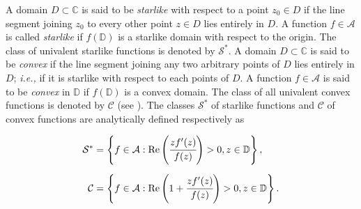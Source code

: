\documentclass[a4paper,12pt]{amsart}
\theoremstyle{definition}
\numberwithin{equation}{section}
\begin{document}
A domain $D \subset \mathbb{C}$ is said to be {\em starlike} with respect to a point $z_0\in D$ if the line segment joining $z_0$ to every other point $z \in D$ lies entirely in $D$. A function $f \in \mathcal{A}$ is called {\em starlike} if $f(\mathbb{D})$ is a starlike domain with respect to the origin. The class of univalent starlike functions is denoted by $\mathcal{S}^*$. A domain $D \subset \mathbb{C}$ is said to be {\em convex} if the line segment joining any two arbitrary points of $D$ lies entirely in $D$; {\em i.e.,} if it is starlike with respect to each points of $D$.
A function $f\in\mathcal{A}$ is said to be {\em convex} in $\mathbb{D}$ if $f(\mathbb{D})$ is a convex domain. The class of all univalent convex functions is denoted by $\mathcal{C}$ (see \cite{Dur83,
vasu-book-2018}). The
classes $\mathcal{S}^*$ of starlike functions and $\mathcal{C}$ of convex functions are analytically defined respectively as

\begin{equation*}
\begin{aligned}
\mathcal{S}^*&=\left\{ f \in \mathcal{A} : {\rm Re}\left(\cfrac{zf'(z)}{f(z)}\right)>0, z \in \mathbb{D} \right\}, \\[2mm]
\mathcal{C}&=\left\{ f \in \mathcal{A} : {\rm Re}\left(1+\cfrac{zf'(z)}{f(z)}\right)>0, z \in \mathbb{D} \right\}.
\end{aligned}
\end{equation*}

\medskip
\end{document}
